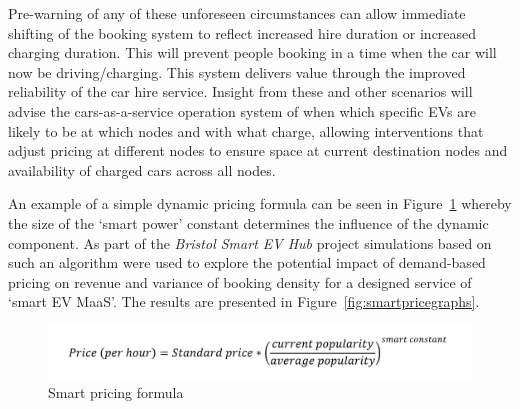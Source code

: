\documentclass[b5paper,10pt]{article}
\begin{document}
Pre-warning of any of these unforeseen circumstances can allow
immediate shifting of the booking system to reflect increased hire
duration or increased charging duration. This will prevent people
booking in a time when the car will now be driving/charging. This
system delivers value through the improved reliability of the car hire
service. Insight from these and other scenarios will advise the
cars-as-a-service operation system of when which specific EVs are
likely to be at which nodes and with what charge, allowing
interventions that adjust pricing at different nodes to ensure space
at current destination nodes and availability of charged cars across
all nodes.

An example of a simple dynamic pricing formula can be seen in
Figure~\ref{fig:smartpricingformula} whereby the size of the `smart
power' constant determines the influence of the dynamic component.  As
part of the {\emph{Bristol Smart EV Hub}} project simulations based on
such an algorithm were used to explore the potential impact of
demand-based pricing on revenue and variance of booking density for a
designed service of `smart EV MaaS'. The results are presented in
Figure~\ref{fig:smartpricegraphs}.


\begin{figure}[htb]
\centering
\includegraphics[width=0.75\columnwidth]{images/smartpricingformula.png}
\caption{Smart pricing formula}
\label{fig:smartpricingformula}
\end{figure}

\end{document}
